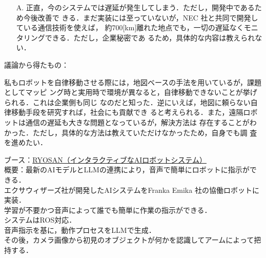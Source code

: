 \documentclass{jsarticle}
\begin{document}
\begin{itemize}
  \item [A.]正直，今のシステムでは遅延が発生してしまう．ただし，開発中であるため今後改善で
  \hspace*{5.5zw}きる．まだ実装には至っていないが，NEC 社と共同で開発している通信技術を使えば，
  \hspace*{5.5zw}約700[km]離れた地点でも，一切の遅延なくモニタリングできる．ただし，企業秘密であ
  \hspace*{5.5zw}るため，具体的な内容は教えられない．\\
\end{itemize}

\hspace*{4.7zw}議論から得たもの：

\hspace*{5.7zw}私もロボットを自律移動させる際には，地図ベースの手法を用いているが，課題としてマッピ
\hspace*{6.7zw}ング時と実用時で環境が異なると，自律移動できないことが挙げられる．これは企業側も同じ
\hspace*{6.7zw}なのだと知った．逆にいえば，地図に頼らない自律移動手段を研究すれば，社会にも貢献でき
\hspace*{6.7zw}ると考えられる．また，遠隔ロボットは通信の遅延も大きな問題となっているが，解決方法は
\hspace*{6.7zw}存在することがわかった．ただし，具体的な方法は教えていただけなかったため，自身でも調
\hspace*{6.7zw}査を進めたい．\\


\vspace*{4mm}

\hspace*{4.7zw}ブース：\underline{RYOSAN（インタラクティブなAIロボットシステム）}\\

\hspace*{4.7zw}概要：最新のAIモデルとLLMの連携により，音声で簡単にロボットに指示ができる．\\
\hspace*{8.7zw}エクサウィザーズ社が開発したAIシステムをFranka Emika 社の協働ロボットに実装．\\
\hspace*{8.7zw}学習が不要かつ音声によって誰でも簡単に作業の指示ができる．\\
\hspace*{8.7zw}システムはROS対応．\\
\hspace*{8.7zw}音声指示を基に，動作プロセスをLLMで生成．\\
\hspace*{8.7zw}その後，カメラ画像から初見のオブジェクトが何かを認識してアームによって把持する．\\
\end{document}
